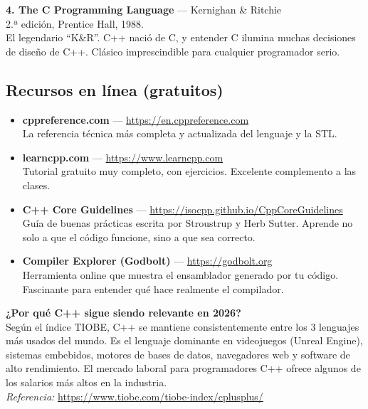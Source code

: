 \documentclass[12pt, oneside]{article}
\begin{document}
\vspace{0.8em}
\textbf{4. The C Programming Language} — Kernighan \& Ritchie\\
2.ª edición, Prentice Hall, 1988.\\
El legendario ``K\&R''. C++ nació de C, y entender C ilumina muchas
decisiones de diseño de C++. Clásico imprescindible para cualquier
programador serio.

\subsection{Recursos en línea (gratuitos)}

\begin{itemize}
  \item \textbf{cppreference.com} — \url{https://en.cppreference.com}\\
        La referencia técnica más completa y actualizada del lenguaje y la STL.

  \item \textbf{learncpp.com} — \url{https://www.learncpp.com}\\
        Tutorial gratuito muy completo, con ejercicios. Excelente complemento
        a las clases.

  \item \textbf{C++ Core Guidelines} — \url{https://isocpp.github.io/CppCoreGuidelines}\\
        Guía de buenas prácticas escrita por Stroustrup y Herb Sutter.
        Aprende no solo a que el código funcione, sino a que sea correcto.

  \item \textbf{Compiler Explorer (Godbolt)} — \url{https://godbolt.org}\\
        Herramienta online que muestra el ensamblador generado por tu código.
        Fascinante para entender qué hace realmente el compilador.
\end{itemize}

\begin{tecnico}
  \textbf{¿Por qué C++ sigue siendo relevante en 2026?}\\
  Según el índice TIOBE, C++ se mantiene consistentemente entre los 3
  lenguajes más usados del mundo. Es el lenguaje dominante en
  videojuegos (Unreal Engine), sistemas embebidos, motores de bases de
  datos, navegadores web y software de alto rendimiento. El mercado
  laboral para programadores C++ ofrece algunos de los salarios más
  altos en la industria.\\
  \textit{Referencia:} \url{https://www.tiobe.com/tiobe-index/cplusplus/}
\end{tecnico}
\end{document}
